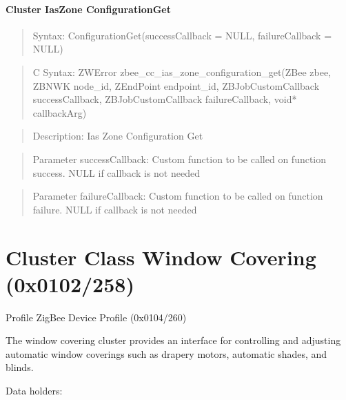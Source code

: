 \paragraph{Cluster IasZone ConfigurationGet}
\begin{quote}Syntax: ConfigurationGet(successCallback = NULL, failureCallback = NULL)\end{quote}
\begin{quote}C Syntax: ZWError zbee\_cc\_ias\_zone\_configuration\_get(ZBee zbee, ZBNWK node\_id, ZEndPoint endpoint\_id, ZBJobCustomCallback successCallback, ZBJobCustomCallback failureCallback, void* callbackArg)\end{quote}
\begin{quote}Description: Ias Zone Configuration Get\end{quote}
\begin{quote}Parameter successCallback: Custom function to be called on function success. NULL if callback is not needed\end{quote}
\begin{quote}Parameter failureCallback: Custom function to be called on function failure. NULL if callback is not needed\end{quote}



\section{Cluster Class Window Covering (0x0102/258)}

Profile ZigBee Device Profile (0x0104/260)

The window covering cluster provides an interface for controlling and adjusting automatic window coverings such as drapery motors, automatic shades, and blinds.
\newline

\noindent
Data holders:

